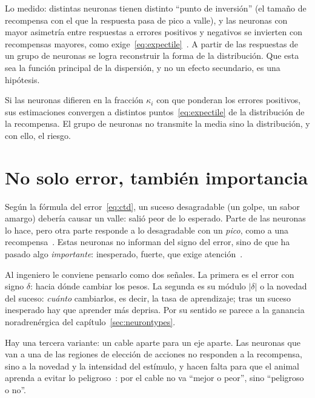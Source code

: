 Lo medido: distintas neuronas  tienen distinto “punto de inversión” (el tamaño de recompensa con el que la respuesta pasa de pico a valle), y las neuronas con mayor asimetría entre respuestas a errores positivos y negativos se invierten con recompensas mayores, como exige~\eqref{eq:expectile}~\cite{Dabney2020}. A partir de las respuestas de un grupo de neuronas se logra reconstruir la forma de la distribución. Que esta sea la función principal de la dispersión, y no un efecto secundario, es una hipótesis.

\begin{keyblock}
\begin{proposition}
\label{prop:expectile}
Si las neuronas  difieren en la fracción $\kappa_i$ con que ponderan los errores positivos, sus estimaciones convergen a distintos puntos~\eqref{eq:expectile} de la distribución de la recompensa. El grupo de neuronas no transmite la media sino la distribución, y con ello, el riesgo.
\end{proposition}
\end{keyblock}

\section{No solo error, también importancia}

Según la fórmula del error~\eqref{eq:ctd}, un suceso desagradable (un golpe, un sabor amargo) debería causar un valle: salió peor de lo esperado. Parte de las neuronas  lo hace, pero otra parte responde a lo desagradable con un \emph{pico}, como a una recompensa~\cite{Matsumoto2009}. Estas neuronas no informan del signo del error, sino de que ha pasado algo \emph{importante}: inesperado, fuerte, que exige atención~\cite{BrombergMartin2010}.

Al ingeniero le conviene pensarlo como dos señales. La primera es el error con signo $\delta$: hacia dónde cambiar los pesos. La segunda es su módulo $|\delta|$ o la novedad del suceso: \emph{cuánto} cambiarlos, es decir, la tasa de aprendizaje; tras un suceso inesperado hay que aprender más deprisa. Por su sentido se parece a la ganancia noradrenérgica del capítulo~\ref{sec:neurontypes}.

Hay una tercera variante: un cable aparte para un eje aparte. Las neuronas  que van a una de las regiones de elección de acciones no responden a la recompensa, sino a la novedad y la intensidad del estímulo, y hacen falta para que el animal aprenda a evitar lo peligroso~\cite{Menegas2018}: por el cable no va “mejor o peor”, sino “peligroso o no”.

